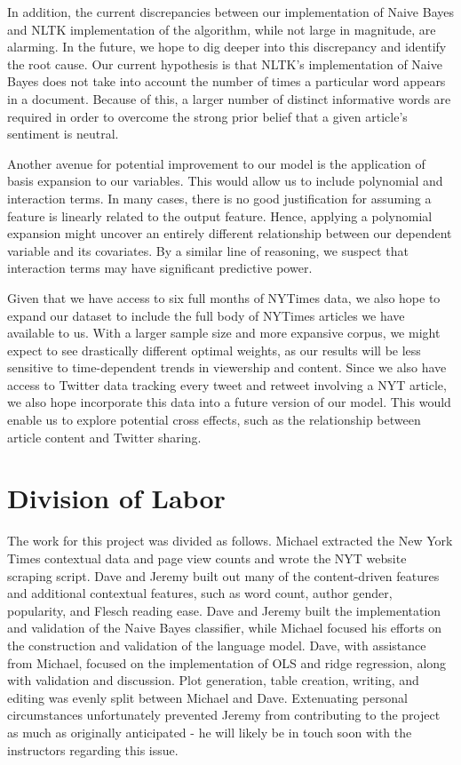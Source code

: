 \documentclass[fleqn,12pt]{SelfArx} %
\begin{document}
In addition, the current discrepancies between our implementation of Naive Bayes and NLTK implementation of the algorithm, while not large in magnitude, are alarming. In the future, we hope to dig deeper into this discrepancy and identify the root cause. Our current hypothesis is that NLTK's implementation of Naive Bayes does not take into account the number of times a particular word appears in a document. Because of this, a larger number of distinct informative words are required in order to overcome the strong prior belief that a given article's sentiment is neutral.

Another avenue for potential improvement to our model is the application of basis expansion to our variables. This would allow us to include polynomial and interaction terms. In many cases, there is no good justification for assuming a feature is linearly related to the output feature. Hence, applying a polynomial expansion might uncover an entirely different relationship between our dependent variable and its covariates. By a similar line of reasoning, we suspect that interaction terms may have significant predictive power. 

Given that we have access to six full months of NYTimes data, we also hope to expand our dataset to include the full body of NYTimes articles we have available to us. With a larger sample size and more expansive corpus, we might expect to see drastically different optimal weights, as our results will be less sensitive to time-dependent trends in viewership and content. Since we also have access to Twitter data tracking every tweet and retweet involving a NYT article, we also hope incorporate this data into a future version of our model. This would enable us to explore potential cross effects, such as the relationship between article content and Twitter sharing.

\section{Division of Labor}

The work for this project was divided as follows. Michael extracted the New York Times contextual data and page view counts and wrote the NYT website scraping script. Dave and Jeremy built out many of the content-driven features and additional contextual features, such as word count, author gender, popularity, and Flesch reading ease. Dave and Jeremy built the implementation and validation of the Naive Bayes classifier, while Michael focused his efforts on the construction and validation of the language model. Dave, with assistance from Michael, focused on the implementation of OLS and ridge regression, along with validation and discussion. Plot generation, table creation, writing, and editing was evenly split between Michael and Dave. Extenuating personal circumstances unfortunately prevented Jeremy from contributing to the project as much as originally anticipated - he will likely be in touch soon with the instructors regarding this issue.
\end{document}
